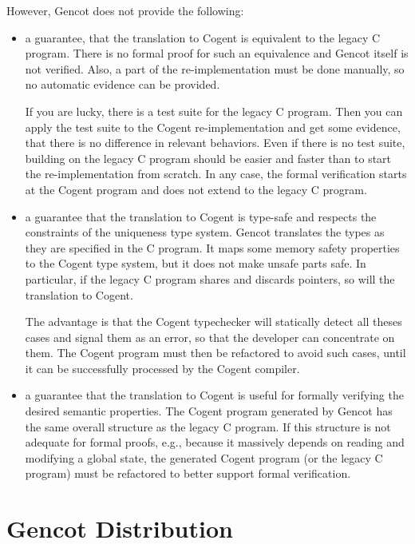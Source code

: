 \documentclass[a4paper]{report}
\begin{document}
However, Gencot does not provide the following:
\begin{itemize}
\item a guarantee, that the translation to Cogent is equivalent to the legacy C program. There is no formal
proof for such an equivalence and Gencot itself is not verified. Also, a part of the re-implementation must 
be done manually, so no automatic evidence can be provided. 

If you are lucky, there is a test suite for the legacy C program. Then you can apply the test suite to the 
Cogent re-implementation and get some evidence, that there is no difference in relevant behaviors. Even if
there is no test suite, building on the legacy C program should be easier and faster than to start the 
re-implementation from scratch. In any case, the formal verification starts at the Cogent program and does not 
extend to the legacy C program.

\item a guarantee that the translation to Cogent is type-safe and respects the constraints of the uniqueness
type system. Gencot translates the types as they are specified in the C program. It maps some memory safety
properties to the Cogent type system, but it does not make unsafe parts safe. In particular, if the legacy
C program shares and discards pointers, so will the translation to Cogent. 

The advantage is that the Cogent typechecker will statically detect all theses cases and signal them as an
error, so that the developer can concentrate on them. The Cogent program must then be refactored to avoid 
such cases, until it can be successfully processed by the Cogent compiler.

\item a guarantee that the translation to Cogent is useful for formally verifying the desired semantic properties. 
The Cogent program generated by Gencot has the same overall structure as the legacy C program. If this structure
is not adequate for formal proofs, e.g., because it massively depends on reading and modifying a global state,
the generated Cogent program (or the legacy C program) must be refactored to better support formal verification.
\end{itemize}

\section{Gencot Distribution}
\label{intro-dist}
\end{document}
